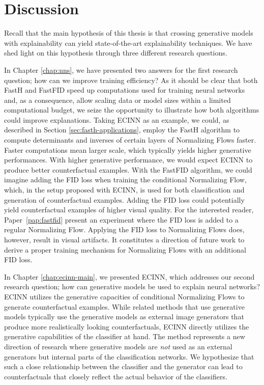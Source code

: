 \documentclass[11pt,a4paper,twoside,openright,final]{memoir}
\newcommand*{\paperref}[1]{Paper~\hyperref[#1]{\ref{#1}}}
\begin{document}
\section{Discussion}\label{sec:conclusion-discussion}
Recall that the main hypothesis of this thesis is that crossing generative models with explainability can yield state-of-the-art explainability techniques. 
We have shed light on this hypothesis through three different research questions.

In Chapter \ref{chap:nns}, we have presented two answers for the first research question; how can we improve training efficiency?
As it should be clear that both FastH and FastFID speed up computations used for training neural networks and, as a consequence, allow scaling data or model sizes within a limited computational budget, we seize the opportunity to illustrate how both algorithms could improve explanations.
Taking ECINN as an example, we could, as described in Section \ref{sec:fasth-applications}, employ the FastH algorithm to compute determinants and inverses of certain layers of Normalizing Flows faster.
Faster computations mean larger scale, which typically yields higher generative performances.
With higher generative performance, we would expect ECINN to produce better counterfactual examples. 
With the FastFID algorithm, we could imagine adding the FID loss when training the conditional Normalizing Flow, which, in the setup proposed with ECINN, is used for both classification and generation of counterfactual examples.
Adding the FID loss could potentially yield counterfactual examples of higher visual quality.
For the interested reader, \paperref{pap:fastfid} present an experiment where the FID loss is added to a regular Normalizing Flow.
Applying the FID loss to Normalizing Flows does, however, result in visual artifacts.
It constitutes a direction of future work to derive a proper training mechanism for Normalizing Flows with an additional FID loss. 

In Chapter \ref{chap:ecinn-main}, we presented ECINN, which addresses our second research question; how can generative models be used to explain neural networks?
ECINN utilizes the generative capacities of conditional Normalizing Flows to generate counterfactual examples. 
While related methods that use generative models typically use the generative models as external image generators that produce more realistically looking counterfactuals, ECINN directly utilizes the generative capabilities of the classifier at hand. %
The method represents a new direction of research where generative models are \emph{not} used as an external generators but internal parts of the classification networks.
We hypothesize that such a close relationship between the classifier and the generator can lead to counterfactuals that closely reflect the actual behavior of the classifiers. 
\end{document}
